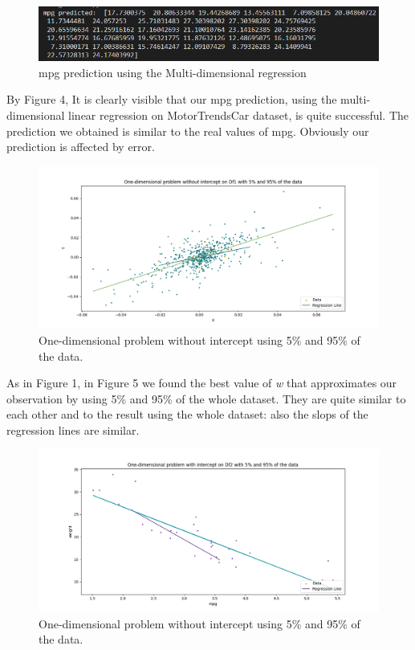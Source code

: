 \documentclass[10pt]{article}
\begin{document}
\begin{figure}[h] 
	\centering
	\includegraphics[width=1.0\columnwidth]{mpg.png} %
	\caption{mpg prediction using the Multi-dimensional regression}
\end{figure}
By Figure 4, It is clearly visible that our mpg prediction, using the multi-dimensional linear regression on MotorTrendsCar dataset, is quite successful. The prediction we obtained is similar to the real values of mpg. Obviously our prediction is affected by error.
\newpage

\begin{figure}[h] 
	\centering
	\includegraphics[width=1.0\columnwidth]{Figure_4.png} %
	\caption{One-dimensional problem without intercept using 5\% and 95\% of the data.}
\end{figure}


As in Figure 1, in Figure 5 we found the best value of \textit{w} that approximates our observation by using 5\% and 95\% of the whole dataset. They are quite similar to each other and to the result using the whole dataset: also the slops of the regression lines are similar.
\begin{figure}[h] 
	\centering
	\includegraphics[width=1.0\columnwidth]{Figure_5.png} %
	\caption{One-dimensional problem without intercept using 5\% and 95\% of the data.}
\end{figure}
\end{document}
